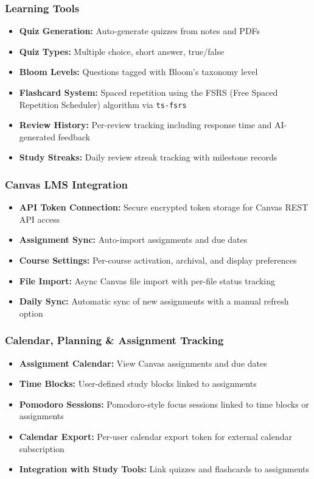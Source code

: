 \documentclass[12pt,a4paper]{article}
\begin{document}
\subsubsection{Learning Tools}

\begin{itemize}
    \item \textbf{Quiz Generation:} Auto-generate quizzes from notes and PDFs
    \item \textbf{Quiz Types:} Multiple choice, short answer, true/false
    \item \textbf{Bloom Levels:} Questions tagged with Bloom's taxonomy level
    \item \textbf{Flashcard System:} Spaced repetition using the FSRS (Free Spaced Repetition Scheduler) algorithm via \texttt{ts-fsrs}
    \item \textbf{Review History:} Per-review tracking including response time and AI-generated feedback
    \item \textbf{Study Streaks:} Daily review streak tracking with milestone records
\end{itemize}

\subsubsection{Canvas LMS Integration}

\begin{itemize}
    \item \textbf{API Token Connection:} Secure encrypted token storage for Canvas REST API access
    \item \textbf{Assignment Sync:} Auto-import assignments and due dates
    \item \textbf{Course Settings:} Per-course activation, archival, and display preferences
    \item \textbf{File Import:} Async Canvas file import with per-file status tracking
    \item \textbf{Daily Sync:} Automatic sync of new assignments with a manual refresh option
\end{itemize}

\subsubsection{Calendar, Planning \& Assignment Tracking}

\begin{itemize}
    \item \textbf{Assignment Calendar:} View Canvas assignments and due dates
    \item \textbf{Time Blocks:} User-defined study blocks linked to assignments
    \item \textbf{Pomodoro Sessions:} Pomodoro-style focus sessions linked to time blocks or assignments
    \item \textbf{Calendar Export:} Per-user calendar export token for external calendar subscription
    \item \textbf{Integration with Study Tools:} Link quizzes and flashcards to assignments
\end{itemize}
\end{document}
